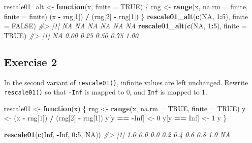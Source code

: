 \documentclass[]{book}
\newenvironment{Shaded}{\begin{snugshade}}{\end{snugshade}}
\newcommand{\CommentTok}[1]{\textcolor[rgb]{0.56,0.35,0.01}{\textit{#1}}}
\newcommand{\ControlFlowTok}[1]{\textcolor[rgb]{0.13,0.29,0.53}{\textbf{#1}}}
\newcommand{\DataTypeTok}[1]{\textcolor[rgb]{0.13,0.29,0.53}{#1}}
\newcommand{\DecValTok}[1]{\textcolor[rgb]{0.00,0.00,0.81}{#1}}
\newcommand{\KeywordTok}[1]{\textcolor[rgb]{0.13,0.29,0.53}{\textbf{#1}}}
\newcommand{\NormalTok}[1]{#1}
\newcommand{\OperatorTok}[1]{\textcolor[rgb]{0.81,0.36,0.00}{\textbf{#1}}}
\newcommand{\OtherTok}[1]{\textcolor[rgb]{0.56,0.35,0.01}{#1}}
\newcommand{\StringTok}[1]{\textcolor[rgb]{0.31,0.60,0.02}{#1}}
\theoremstyle{definition}
\theoremstyle{definition}
\theoremstyle{definition}
\theoremstyle{remark}
\begin{document}
\begin{Shaded}
\begin{Highlighting}[]
\NormalTok{rescale01_alt <-}\StringTok{ }\ControlFlowTok{function}\NormalTok{(x, }\DataTypeTok{finite =} \OtherTok{TRUE}\NormalTok{) \{}
\NormalTok{  rng <-}\StringTok{ }\KeywordTok{range}\NormalTok{(x, }\DataTypeTok{na.rm =}\NormalTok{ finite, }\DataTypeTok{finite =}\NormalTok{ finite)}
\NormalTok{  (x }\OperatorTok{-}\StringTok{ }\NormalTok{rng[}\DecValTok{1}\NormalTok{]) }\OperatorTok{/}\StringTok{ }\NormalTok{(rng[}\DecValTok{2}\NormalTok{] }\OperatorTok{-}\StringTok{ }\NormalTok{rng[}\DecValTok{1}\NormalTok{])}
\NormalTok{\}}
\KeywordTok{rescale01_alt}\NormalTok{(}\KeywordTok{c}\NormalTok{(}\OtherTok{NA}\NormalTok{, }\DecValTok{1}\OperatorTok{:}\DecValTok{5}\NormalTok{), }\DataTypeTok{finite =} \OtherTok{FALSE}\NormalTok{)}
\CommentTok{#> [1] NA NA NA NA NA NA}
\KeywordTok{rescale01_alt}\NormalTok{(}\KeywordTok{c}\NormalTok{(}\OtherTok{NA}\NormalTok{, }\DecValTok{1}\OperatorTok{:}\DecValTok{5}\NormalTok{), }\DataTypeTok{finite =} \OtherTok{TRUE}\NormalTok{)}
\CommentTok{#> [1]   NA 0.00 0.25 0.50 0.75 1.00}
\end{Highlighting}
\end{Shaded}

\hypertarget{exercise-2-43}{%
\subsection{Exercise 2}\label{exercise-2-43}}

In the second variant of \texttt{rescale01()}, infinite values are left
unchanged. Rewrite \texttt{rescale01()} so that \texttt{-Inf} is mapped
to 0, and \texttt{Inf} is mapped to 1.

\begin{Shaded}
\begin{Highlighting}[]
\NormalTok{rescale01 <-}\StringTok{ }\ControlFlowTok{function}\NormalTok{(x) \{}
\NormalTok{  rng <-}\StringTok{ }\KeywordTok{range}\NormalTok{(x, }\DataTypeTok{na.rm =} \OtherTok{TRUE}\NormalTok{, }\DataTypeTok{finite =} \OtherTok{TRUE}\NormalTok{)}
\NormalTok{  y <-}\StringTok{ }\NormalTok{(x }\OperatorTok{-}\StringTok{ }\NormalTok{rng[}\DecValTok{1}\NormalTok{]) }\OperatorTok{/}\StringTok{ }\NormalTok{(rng[}\DecValTok{2}\NormalTok{] }\OperatorTok{-}\StringTok{ }\NormalTok{rng[}\DecValTok{1}\NormalTok{])}
\NormalTok{  y[y }\OperatorTok{==}\StringTok{ }\OperatorTok{-}\OtherTok{Inf}\NormalTok{] <-}\StringTok{ }\DecValTok{0}
\NormalTok{  y[y }\OperatorTok{==}\StringTok{ }\OtherTok{Inf}\NormalTok{] <-}\StringTok{ }\DecValTok{1}
\NormalTok{  y}
\NormalTok{\}}

\KeywordTok{rescale01}\NormalTok{(}\KeywordTok{c}\NormalTok{(}\OtherTok{Inf}\NormalTok{, }\OperatorTok{-}\OtherTok{Inf}\NormalTok{, }\DecValTok{0}\OperatorTok{:}\DecValTok{5}\NormalTok{, }\OtherTok{NA}\NormalTok{))}
\CommentTok{#> [1] 1.0 0.0 0.0 0.2 0.4 0.6 0.8 1.0  NA}
\end{Highlighting}
\end{Shaded}
\end{document}
